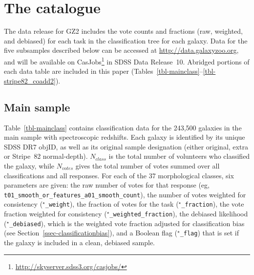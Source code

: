 \documentclass[useAMS,usenatbib]{mn2e}
\providecommand{\DIFaddtex}[1]{{\protect\color{blue}\uwave{#1}}} %
\providecommand{\DIFdeltex}[1]{{\protect\color{red}\sout{#1}}}                      %
\providecommand{\DIFaddbegin}{} %
\providecommand{\DIFaddend}{} %
\providecommand{\DIFdelbegin}{} %
\providecommand{\DIFdelend}{} %
\providecommand{\DIFadd}[1]{\texorpdfstring{\DIFaddtex{#1}}{#1}} %
\providecommand{\DIFdel}[1]{\texorpdfstring{\DIFdeltex{#1}}{}} %
\begin{document}

\section{The catalogue} \label{sec-catalogue}


The data release for GZ2 includes the vote counts and fractions (raw, weighted, and debiased) for each task in the classification tree for each galaxy. Data for the five subsamples described below can be accessed at \url{http://data.galaxyzoo.org}, and will be available on CasJobs\footnote{\url{http://skyserver.sdss3.org/casjobs/}} in SDSS Data Release~10. Abridged portions of each data table are included in this paper (Tables~\ref{tbl-mainclass}--\ref{tbl-stripe82_coadd2}).

\subsection{Main sample}\label{ssec-catalogue_main}

Table~\ref{tbl-mainclass} contains classification data for the 243,500 galaxies in the main sample with spectroscopic redshifts. Each galaxy is identified by its unique SDSS DR7 objID, as well as its original sample designation (either original, extra or Stripe~82 normal-depth). \DIFdelbegin \DIFdel{$N_{class}$ }\DIFdelend \DIFaddbegin \DIFadd{$N_\mathrm{class}$ }\DIFaddend is the total number of volunteers who classified the galaxy, while \DIFdelbegin \DIFdel{$N_{votes}$ }\DIFdelend \DIFaddbegin \DIFadd{$N_\mathrm{votes}$ }\DIFaddend gives the total number of votes summed over all classifications and all responses. For each of the 37 morphological classes, six parameters are given: the raw number of votes for that response (eg, {\tt t01\_smooth\_or\_features\_a01\_smooth\_count}), the number of votes weighted for consistency ({\tt $^\star$\_weight}), the fraction of votes for the task ({\tt $^\star$\_fraction}), the vote fraction weighted for consistency ({\tt $^\star$\_weighted\_fraction}), the debiased likelihood ({\tt $^\star$\_debiased}), which is the weighted vote fraction adjusted for classification bias (see Section~\ref{ssec-classificationbias}), and a Boolean flag ({\tt $^\star$\_flag}) that is set if the galaxy is included in a clean, debiased sample.
\end{document}
